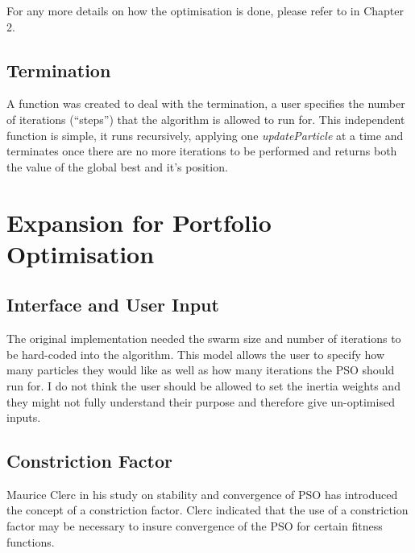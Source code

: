 \documentclass{pdfmx4020}
\begin{document}
    For any more details on how the optimisation is done, please refer to  in Chapter 2.
    \subsection{Termination} %
    \label{sub:termination}
    A function was created to deal with the termination, a user specifies the number of iterations (``steps'') that the algorithm is allowed to run for. This independent function is simple, it runs recursively, applying one \textit{updateParticle} at a time and terminates once there are no more iterations to be performed and returns both the value of the global best and it's position. 

  \section{Expansion for Portfolio Optimisation} %
  \label{sec:expansion_for_portfolio_optimisation}

    \subsection{Interface and User Input} %
    \label{sub:interface_and_user_input}
    The original implementation needed the swarm size and number of iterations to be hard-coded into the algorithm. This model allows the user to specify how many particles they would like as well as how many iterations the PSO should run for. I do not think the user should be allowed to set the inertia weights and they might not fully understand their purpose and therefore give un-optimised inputs. 
    
    \subsection{Constriction Factor} %
    \label{sub:constriction_factor}
    Maurice Clerc in his study on stability and convergence of PSO \cite{constriction_factor} has introduced the concept of a constriction factor. Clerc indicated that the use of a constriction factor may be necessary to insure convergence of the PSO for certain fitness functions.
\end{document}
